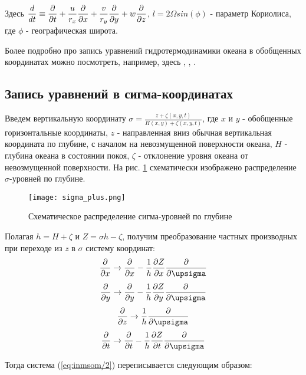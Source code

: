 	Здесь $\displaystyle{\frac{d}{dt} \equiv \frac{\partial}{\partial t} + \frac{u}{r_x} \frac{\partial}{\partial x} + \frac{v}{r_y}\frac{\partial}{\partial y} + w\frac{\partial}{\partial z} }$, $l = 2 \Omega sin(\phi)$ - параметр Кориолиса,
	где $\phi$ - географическая широта.
	
	Более подробно про запись уравнений гидротермодинамики океана в обобщенных координатах можно посмотреть, например, здесь \cite{INMOM}, \cite{SuhovPhD}, \cite{GusevPhD}.
	
\subsection{Запись уравнений в сигма-координатах}
	Введем вертикальную координату $\displaystyle{ \sigma = \frac{z + \zeta(x, y, t)}{H(x, y) + \zeta(x, y, t)} }$, где $x$ и $y$ - обобщенные горизонтальные
	координаты, $z$ - направленная вниз обычная вертикальная координата по глубине,
	с началом на невозмущенной поверхности океана, $H$ - глубина океана в состоянии покоя, $\zeta$ - отклонение уровня океана от невозмущенной
	поверхности. На рис. \ref{fig:sigma_levels} схематически изображено распределение $\sigma$-уровней по глубине. 
	
	\begin{figure}[htb!]
	\center
	\texttt{[image: sigma\_plus.png]}
	\caption{Схематическое распределение сигма-уровней по глубине}
	\label{fig:sigma_levels}
	\end{figure}
	
	Полагая $h = H + \zeta$ 
	и $Z = \sigma h - \zeta$,
	получим преобразование частных производных при переходе из $z$ в $\sigma$ систему координат:
	$$ \d{}{x} \rightarrow \d{}{x} - \frac{1}{h} \d{Z}{x} \d{}{\sigma} $$
	$$ \d{}{y} \rightarrow \d{}{y} - \frac{1}{h} \d{Z}{y} \d{}{\sigma} $$
	$$ \d{}{z} \rightarrow \frac{1}{h} \d{}{\sigma} $$
	$$ \d{}{t} \rightarrow \d{}{t} - \frac{1}{h}\d{Z}{t}\d{}{\sigma} $$
	
	
	Тогда система (\ref{eq:inmsom/2}) переписывается следующим образом:
	
